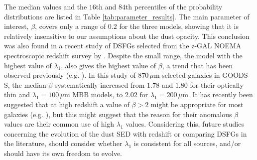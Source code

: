 The median values and the $16$th and $84$th percentiles of the probability distributions are listed in Table \ref{tab:parameter_results}. The main parameter of interest, $\beta$, covers only a range of $0.2$ for the three models, showing that it is relatively insensitive to our assumptions about the dust opacity. This conclusion was also found in a recent study of DSFGs selected from the z-GAL NOEMA spectroscopic redshift survey by \citealt{Ismail_2023}. Despite the small range, the model with the highest value of $\lambda_1$, also gives the highest value of $\beta$, a trend that has been observed previously (e.g. \citealt{McKay_2023}). In this study of $870\,\mu$m selected galaxies in GOODS-S, the median $\beta$ systematically increased from $1.78$ and $1.80$ for their optically thin and $\lambda_1 = 100\,\mu$m MBB models, to $2.02$ for $\lambda_1 = 200\,\mu$m. It has recently been suggested that at high redshift a value of $\beta > 2$ might be appropriate for most galaxies (e.g. \citealt{Casey_2019,Casey_2021, Cooper_2022}), but this might suggest that the reason for their anomalous $\beta$ values are their common use of high $\lambda_1$ values. Considering this, future studies concerning the evolution of the dust SED with redshift or comparing DSFGs in the literature, should consider whether $\lambda_1$ is consistent for all sources, and/or should have its own freedom to evolve.

